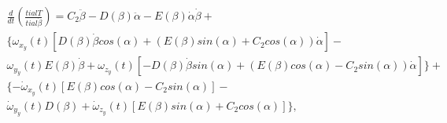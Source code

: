 \begin{equation}%
\label{eq:p3:44+}
\begin{multlined}
\frac{d}{d t}\left( \frac{ tial T}{ tial \dot \beta}\right) = 
C_2 \ddot{\beta} - 
D(\beta) \ddot{\alpha} - 
E(\beta)\dot{\alpha}\dot{\beta}+
\\
\{ 
	\omega_{x_y} (t) \left[ D(\beta) \dot{\beta} cos(\alpha) + ( E(\beta)sin(\alpha) + C_2 cos(\alpha) )\dot{\alpha}\right] -\\
	\omega_{y_y} (t) E(\beta)\dot{\beta}+
	\omega_{z_y} (t) \left[ 
		-D(\beta)\dot{\beta}sin(\alpha)
		+(
			E(\beta)cos(\alpha)
			-C_2 sin(\alpha)
		)\dot{\alpha}
	\right]
\}
+\\
\{
-\dot{\omega}_{x_y} (t) \left[ E(\beta)cos(\alpha) - C_2 sin(\alpha) \right] 
-\\\dot{\omega}_{y_y} (t) D(\beta)
+\dot{\omega}_{z_y} (t) \left[ E(\beta)sin(\alpha) + C_2 cos(\alpha)\right] 
\}
,
\end{multlined}
\end{equation}


